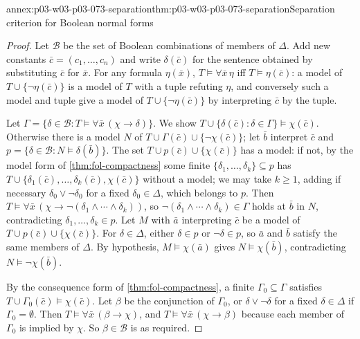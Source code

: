 \begin{annexitem}{annex:p03-w03-p03-073-separation}{thm:p03-w03-p03-073-separation}{Separation criterion for Boolean normal forms}
\begin{proof}
Let \(\mathcal B\) be the set of Boolean combinations of members of
\(\Delta\). Add new constants \(\bar c=(c_1,\ldots,c_n)\) and write
\(\delta(\bar c)\) for the sentence obtained by substituting \(\bar c\) for
\(\bar x\). For any formula \(\eta(\bar x)\),
\(T\models\forall\bar x\,\eta\) iff \(T\models\eta(\bar c)\): a model of
\(T\cup\{\neg\eta(\bar c)\}\) is a model of \(T\) with a tuple refuting
\(\eta\), and conversely such a model and tuple give a model of
\(T\cup\{\neg\eta(\bar c)\}\) by interpreting \(\bar c\) by the tuple.

Let \(\Gamma=\{\delta\in\mathcal B:T\models\forall\bar x\,(\chi\to\delta)\}\).
We show \(T\cup\{\delta(\bar c):\delta\in\Gamma\}\models\chi(\bar c)\).
Otherwise there is a model \(N\) of \(T\cup\Gamma(\bar c)\cup\{\neg\chi(\bar c)\}\);
let \(\bar b\) interpret \(\bar c\) and
\(p=\{\delta\in\mathcal B:N\models\delta(\bar b)\}\). The set
\(T\cup p(\bar c)\cup\{\chi(\bar c)\}\) has a model: if not, by the model
form of \cref{thm:fol-compactness} some finite
\(\{\delta_1,\ldots,\delta_k\}\subseteq p\) has
\(T\cup\{\delta_1(\bar c),\ldots,\delta_k(\bar c),\chi(\bar c)\}\)
without a model; we may take \(k\ge1\), adding if necessary
\(\delta_0\vee\neg\delta_0\) for a fixed \(\delta_0\in\Delta\), which
belongs to \(p\). Then
\(T\models\forall\bar x\,(\chi\to\neg(\delta_1\wedge\cdots\wedge\delta_k))\),
so \(\neg(\delta_1\wedge\cdots\wedge\delta_k)\in\Gamma\) holds at
\(\bar b\) in \(N\), contradicting \(\delta_1,\ldots,\delta_k\in p\).
Let \(M\) with \(\bar a\) interpreting \(\bar c\) be a model of
\(T\cup p(\bar c)\cup\{\chi(\bar c)\}\). For \(\delta\in\Delta\), either
\(\delta\in p\) or \(\neg\delta\in p\), so \(\bar a\) and \(\bar b\)
satisfy the same members of \(\Delta\). By hypothesis,
\(M\models\chi(\bar a)\) gives \(N\models\chi(\bar b)\), contradicting
\(N\models\neg\chi(\bar b)\).

By the consequence form of \cref{thm:fol-compactness}, a finite
\(\Gamma_0\subseteq\Gamma\) satisfies
\(T\cup\Gamma_0(\bar c)\models\chi(\bar c)\). Let \(\beta\) be the
conjunction of \(\Gamma_0\), or \(\delta\vee\neg\delta\) for a fixed
\(\delta\in\Delta\) if \(\Gamma_0=\emptyset\). Then
\(T\models\forall\bar x\,(\beta\to\chi)\), and
\(T\models\forall\bar x\,(\chi\to\beta)\) because each member of
\(\Gamma_0\) is implied by \(\chi\). So \(\beta\in\mathcal B\) is as
required.
\end{proof}
\end{annexitem}

